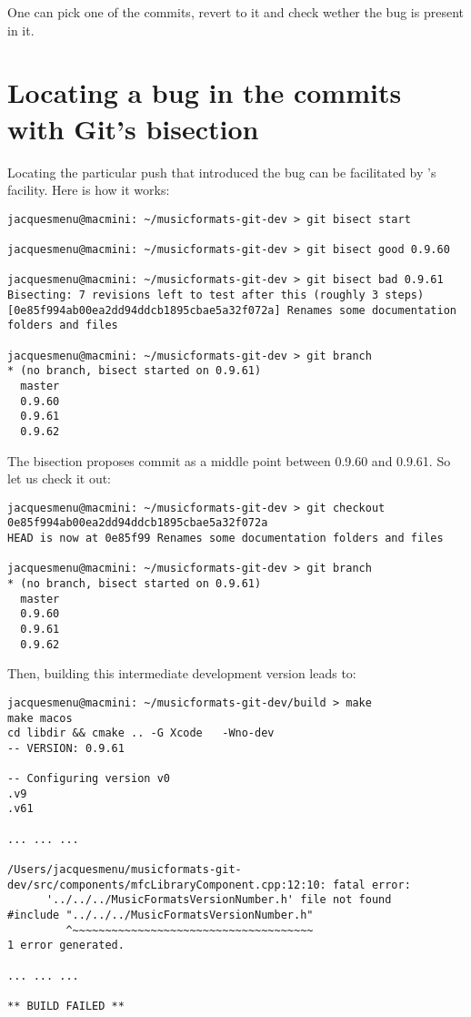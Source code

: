 One can pick one of the commits, revert to it and check wether the bug is present in it.


\section{Locating a bug in the commits with Git's bisection}

Locating the particular push that introduced the bug can be facilitated by \git 's  facility.
Here is how it works:
\begin{lstlisting}[language=Terminal]
jacquesmenu@macmini: ~/musicformats-git-dev > git bisect start

jacquesmenu@macmini: ~/musicformats-git-dev > git bisect good 0.9.60

jacquesmenu@macmini: ~/musicformats-git-dev > git bisect bad 0.9.61
Bisecting: 7 revisions left to test after this (roughly 3 steps)
[0e85f994ab00ea2dd94ddcb1895cbae5a32f072a] Renames some documentation folders and files

jacquesmenu@macmini: ~/musicformats-git-dev > git branch
* (no branch, bisect started on 0.9.61)
  master
  0.9.60
  0.9.61
  0.9.62
\end{lstlisting}

The bisection proposes commit  as a middle point between 0.9.60 and 0.9.61.
So let us check it out:
\begin{lstlisting}[language=Terminal]
jacquesmenu@macmini: ~/musicformats-git-dev > git checkout 0e85f994ab00ea2dd94ddcb1895cbae5a32f072a
HEAD is now at 0e85f99 Renames some documentation folders and files

jacquesmenu@macmini: ~/musicformats-git-dev > git branch
* (no branch, bisect started on 0.9.61)
  master
  0.9.60
  0.9.61
  0.9.62
\end{lstlisting}

Then, building this intermediate development version leads to:
\begin{lstlisting}[language=Terminal]
jacquesmenu@macmini: ~/musicformats-git-dev/build > make
make macos
cd libdir && cmake .. -G Xcode   -Wno-dev
-- VERSION: 0.9.61

-- Configuring version v0
.v9
.v61

... ... ...

/Users/jacquesmenu/musicformats-git-dev/src/components/mfcLibraryComponent.cpp:12:10: fatal error:
      '../../../MusicFormatsVersionNumber.h' file not found
#include "../../../MusicFormatsVersionNumber.h"
         ^~~~~~~~~~~~~~~~~~~~~~~~~~~~~~~~~~~~~~
1 error generated.

... ... ...

** BUILD FAILED **
\end{lstlisting}

